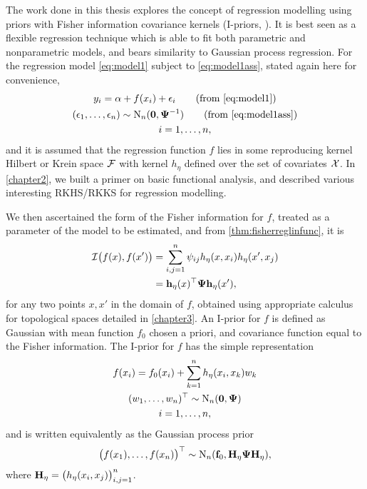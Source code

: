 \documentclass[showframe,11pt,twoside,openright]{report}
\begin{document}
\thispagestyle{chapterseven}

The work done in this thesis explores the concept of regression modelling using priors with Fisher information covariance kernels (I-priors, \cite{bergsma2017}).
It is best seen as a flexible regression technique which is able to fit both parametric and nonparametric models, and bears similarity to Gaussian process regression.
For the regression model \cref{eq:model1} subject to \cref{eq:model1ass}, stated again here for convenience,
\begin{gather}
  y_i = \alpha + f(x_i) + \epsilon_i \tag{from \ref{eq:model1}} \\
  (\epsilon_1,\dots,\epsilon_n) \sim \N_n(\bzero,\bPsi^{-1}) \tag{from \ref{eq:model1ass}} \\
  i = 1,\dots,n, \nonumber
\end{gather}
and it is assumed that the regression function $f$ lies in some reproducing kernel Hilbert or Krein space ${\mathcal F}$ with kernel $h_\eta$ defined over the set of covariates ${\mathcal X}$.
In \cref{chapter2}, we built a primer on basic functional analysis, and described various interesting RKHS/RKKS for regression modelling.

We then ascertained the form of the Fisher information for $f$, treated as a parameter of the model to be estimated, and from \cref{thm:fisherreglinfunc}, it is
\begin{align*}
  {\mathcal I}\big(f(x),f(x') \big) 
  &= \sum_{i,j=1}^n \psi_{ij} h_\eta(x,x_i) h_\eta(x',x_j) \\
  &= {\mathbf h}_\eta(x)^\top{\bm\Psi}{\mathbf h}_\eta(x'), 
\end{align*}
for any two points $x,x'$ in the domain of $f$, obtained using appropriate calculus for topological spaces detailed in \cref{chapter3}.
An I-prior for $f$ is defined as Gaussian with mean function $f_0$ chosen a priori, and covariance function equal to the Fisher information.
The I-prior for $f$ has the simple representation
\begin{gather*}
  f(x_i) = f_0(x_i) + \sum_{k=1}^n h_\eta(x_i,x_k)w_k \\
  (w_1,\dots,w_n)^\top \sim \operatorname{N}_n({\mathbf 0},{\bm\Psi}) \\
  i=1,\dots,n,
\end{gather*}
and is written equivalently as the Gaussian process prior
\begin{equation*}
  \big(f(x_1),\dots,f(x_n) \big)^\top \sim \operatorname{N}_n({\mathbf f}_0, {\mathbf H}_\eta{\bm\Psi}{\mathbf H}_\eta),
\end{equation*}
where ${\mathbf H}_\eta=\big( h_\eta(x_i,x_j) \big)_{i,j=1}^n$.
\end{document}
